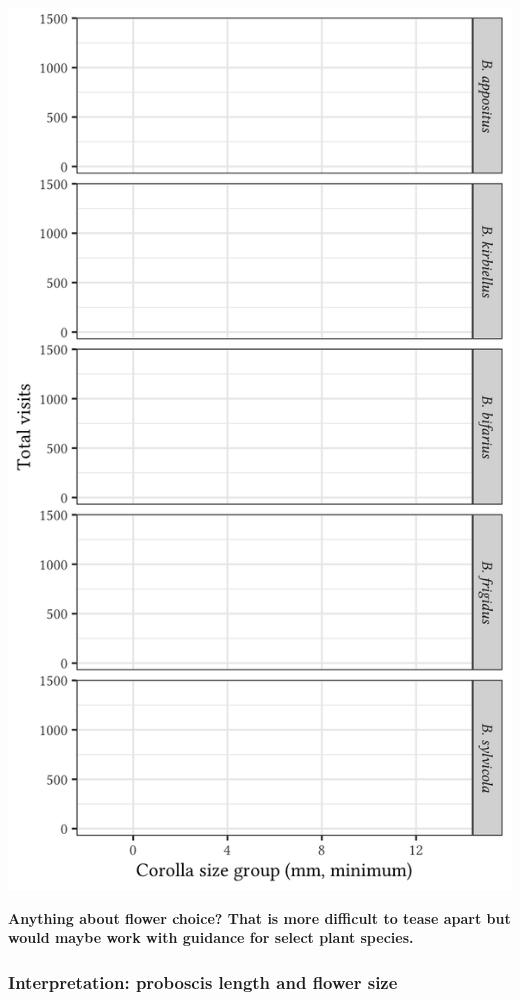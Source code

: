 \documentclass[12pt, hidelinks]{exam}
\begin{document}
\begin{questions}
	\includegraphics[height=\textheight]{flower_visits_blank}
\fi


\newpage



\textbf{Anything about flower choice? That is more difficult to tease apart
	but would maybe work with guidance for select plant species.}


\subsubsection*{Interpretation: proboscis length and flower size}


\end{questions}
\end{document}
